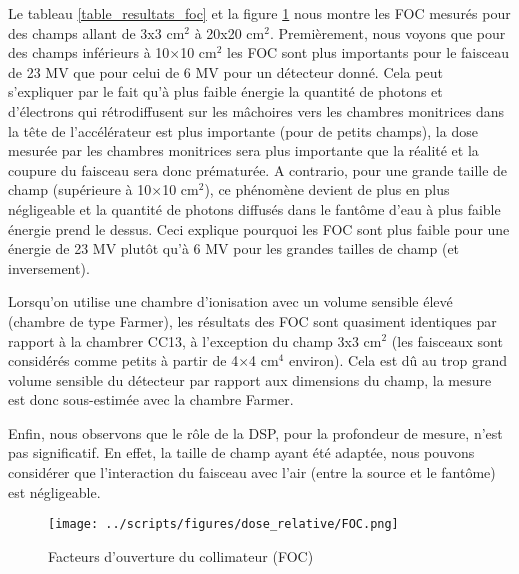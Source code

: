 \documentclass{book}
\begin{document}
Le tableau \ref*{table_resultats_foc} et la figure \ref*{fig_foc} nous montre les FOC mesurés pour des champs allant de 3x3 cm$^2$ à 20x20 cm$^2$. Premièrement, nous voyons que pour des champs inférieurs à 10$\times$10 cm$^2$ les FOC sont plus importants pour le faisceau de 23 MV que pour celui de 6 MV pour un détecteur donné. Cela peut s'expliquer par le fait qu'à plus faible énergie la quantité de photons et d'électrons qui rétrodiffusent sur les mâchoires vers les chambres monitrices dans la tête de l'accélérateur est plus importante (pour de petits champs), la dose mesurée par les chambres monitrices sera plus importante que la réalité et la coupure du faisceau sera donc prématurée. A contrario, pour une grande taille de champ (supérieure à 10$\times$10 cm$^2$), ce phénomène devient de plus en plus négligeable et la quantité de photons diffusés dans le fantôme d'eau à plus faible énergie prend le dessus. Ceci explique pourquoi les FOC sont plus faible pour une énergie de 23 MV plutôt qu'à 6 MV pour les grandes tailles de champ (et inversement).

Lorsqu'on utilise une chambre d'ionisation avec un volume sensible élevé (chambre de type Farmer), les résultats des FOC sont quasiment identiques par rapport à la chambrer CC13, à l'exception du champ 3x3 cm$^2$ (les faisceaux sont considérés comme petits à partir de 4$\times$4 cm$^4$ environ). Cela est dû au trop grand volume sensible du détecteur par rapport aux dimensions du champ, la mesure est donc sous-estimée avec la chambre Farmer.

Enfin, nous observons que le rôle de la DSP, pour la profondeur de mesure, n'est pas significatif. En effet, la taille de champ ayant été adaptée, nous pouvons considérer que l'interaction du faisceau avec l'air (entre la source et le fantôme) est négligeable.

\begin{figure}[h]
  \centering
  \texttt{[image: ../scripts/figures/dose\_relative/FOC.png]}
  \caption{Facteurs d'ouverture du collimateur (FOC)}
  \label{fig_foc}
\end{figure}
\end{document}
